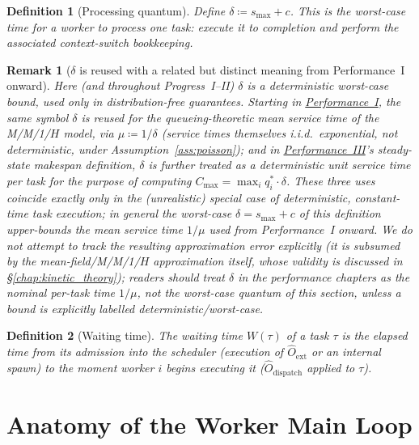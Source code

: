 \documentclass[11pt,a4paper]{report}
\newtheorem{definition}{Definition}[section]
\newtheorem{remark}{Remark}[section]
\begin{document}
\begin{definition}[Processing quantum]
\label{def:delta}
Define $\delta \coloneqq s_{\max} + c$.  This is the worst-case
time for a worker to process one task: execute it to completion
and perform the associated context-switch bookkeeping.
\end{definition}

\begin{remark}[$\delta$ is reused with a related but distinct meaning
from Performance~I onward]
\label{rem:delta-overload}
Here (and throughout Progress~I--II) $\delta$ is a deterministic
\emph{worst-case} bound, used only in distribution-free guarantees.
Starting in \hyperref[chap:load_balance]{Performance~I}, the same symbol
$\delta$ is reused for the queueing-theoretic \emph{mean} service time of
the M/M/1/$H$ model, via $\mu \coloneqq 1/\delta$ (service times
themselves i.i.d.\ exponential, not deterministic, under
Assumption~\ref{ass:poisson}); and in
\hyperref[chap:makespan]{Performance~III}'s steady-state makespan
definition, $\delta$ is further treated as a \emph{deterministic unit
service time per task} for the purpose of computing
$C_{\max} = \max_i q_i^* \cdot \delta$. These three uses coincide
\emph{exactly} only in the (unrealistic) special case of deterministic,
constant-time task execution; in general the worst-case
$\delta = s_{\max}+c$ of this definition upper-bounds the mean service
time $1/\mu$ used from Performance~I onward. We do not attempt to
track the resulting approximation error explicitly (it is subsumed by
the mean-field/M/M/1/$H$ approximation itself, whose validity is
discussed in \S\ref{chap:kinetic_theory}); readers should treat
$\delta$ in the performance chapters as the \emph{nominal} per-task time
$1/\mu$, not the worst-case quantum of this section, unless a bound is
explicitly labelled deterministic/worst-case.
\end{remark}

\begin{definition}[Waiting time]
\label{def:wait}
The \emph{waiting time} $W(\tau)$ of a task $\tau$ is the elapsed
time from its admission into the scheduler (execution of
$\hat{O}_{\text{ext}}$ or an internal spawn) to the moment worker
$i$ begins executing it ($\hat{O}_{\text{dispatch}}$ applied to
$\tau$).
\end{definition}

\section{Anatomy of the Worker Main Loop}
\end{document}

